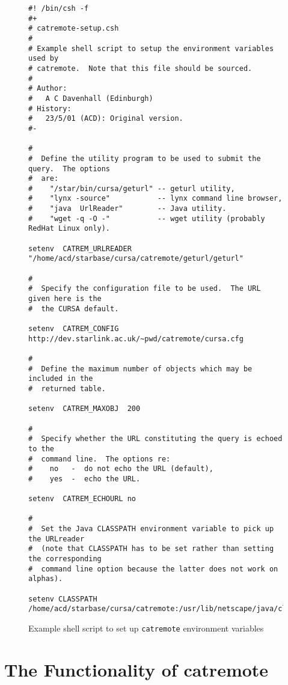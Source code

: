 \documentclass[twoside,11pt]{article}
\newcommand{\xlabel}[1]{}
\renewcommand{\_}{\texttt{\symbol{95}}}
\begin{document}
\begin{figure}[htbp]

{\small
\begin{verbatim}
#! /bin/csh -f
#+
# catremote-setup.csh
#
# Example shell script to setup the environment variables used by
# catremote.  Note that this file should be sourced.
#
# Author:
#   A C Davenhall (Edinburgh)
# History:
#   23/5/01 (ACD): Original version.
#-

#
#  Define the utility program to be used to submit the query.  The options
#  are:
#    "/star/bin/cursa/geturl" -- geturl utility, 
#    "lynx -source"           -- lynx command line browser,
#    "java  UrlReader"        -- Java utility.
#    "wget -q -O -"           -- wget utility (probably RedHat Linux only).

setenv  CATREM_URLREADER "/home/acd/starbase/cursa/catremote/geturl/geturl"

#
#  Specify the configuration file to be used.  The URL given here is the
#  the CURSA default.

setenv  CATREM_CONFIG  http://dev.starlink.ac.uk/~pwd/catremote/cursa.cfg

#
#  Define the maximum number of objects which may be included in the
#  returned table.

setenv  CATREM_MAXOBJ  200

#
#  Specify whether the URL constituting the query is echoed to the
#  command line.  The options re:
#    no   -  do not echo the URL (default),
#    yes  -  echo the URL.

setenv  CATREM_ECHOURL no

#
#  Set the Java CLASSPATH environment variable to pick up the URLreader
#  (note that CLASSPATH has to be set rather than setting the corresponding
#  command line option because the latter does not work on alphas).

setenv CLASSPATH /home/acd/starbase/cursa/catremote:/usr/lib/netscape/java/classes
\end{verbatim}
}

\begin{quote}
\caption{Example shell script to set up {\tt catremote} environment
variables  \label{SETENVAR} }
\end{quote}

\end{figure}


\section{\xlabel{FUNC}\label{FUNC}The Functionality of catremote}
\end{document}
